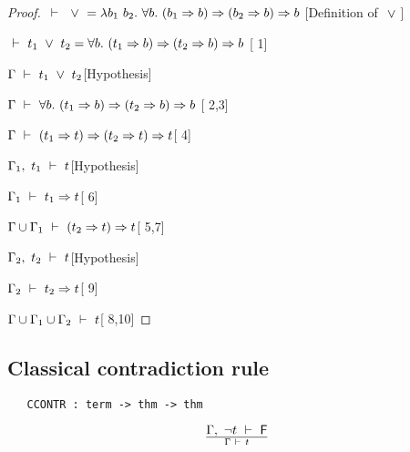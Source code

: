 \begin{proof}
\item $\ \vdash\  \ \vee\  = 
\lambda b_1\ b_2.\ \forall b.\ (b_1\Rightarrow b)\Rightarrow(b_2\Rightarrow b)\Rightarrow b$
\hfill [Definition of $\ \vee\ $]
\item $\ \vdash\  t_1\ \vee\  t_2 = \forall b.\ (t_1\Rightarrow b)\Rightarrow(t_2\Rightarrow b)\Rightarrow b$
\hfill [ 1]
\item $\Gamma\ \vdash\  t_1\ \vee\  t_2$\hfill [Hypothesis]
\item $\Gamma\ \vdash\ \forall b.\ (t_1\Rightarrow b)\Rightarrow(t_2\Rightarrow b)\Rightarrow b$\hfill
[ 2,3]
\item $\Gamma\ \vdash\ (t_1\Rightarrow t)\Rightarrow(t_2\Rightarrow t)\Rightarrow t$\hfill [ 4]
\item $\Gamma_1,\ t_1\ \vdash\  t$\hfill [Hypothesis]
\item $\Gamma_1\ \vdash\  t_1\Rightarrow t$\hfill [ 6]
\item $\Gamma\cup \Gamma_1\ \vdash\  (t_2\Rightarrow t)\Rightarrow t$\hfill [ 5,7]
\item $\Gamma_2,\ t_2\ \vdash\  t$\hfill [Hypothesis]
\item $\Gamma_2\ \vdash\  t_2\Rightarrow t$\hfill [ 9]
\item $\Gamma\cup \Gamma_1\cup \Gamma_2\ \vdash\  t$\hfill [ 8,10]
\end{proof}




\subsection{Classical contradiction rule}

\begin{boxed}
\begin{verbatim}
   CCONTR : term -> thm -> thm
\end{verbatim}\end{boxed}

\vspace{12pt plus2pt minus1pt}

$$\Gamma,\ \neg t\ \vdash\  \mbox{\normalsize\sf F}\over \Gamma\ \vdash\  t$$

\vspace{12pt plus2pt minus1pt}

